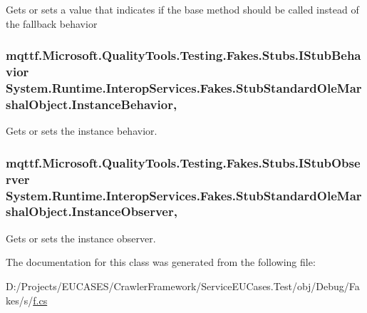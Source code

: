 Gets or sets a value that indicates if the base method should be called instead of the fallback behavior

\hypertarget{class_system_1_1_runtime_1_1_interop_services_1_1_fakes_1_1_stub_standard_ole_marshal_object_a62f581f22e509ef5018a42f3ec38cc95}{
\subsubsection[{Instance\-Behavior}]{\setlength{\rightskip}{0pt plus 5cm}mqttf.\-Microsoft.\-Quality\-Tools.\-Testing.\-Fakes.\-Stubs.\-I\-Stub\-Behavior System.\-Runtime.\-Interop\-Services.\-Fakes.\-Stub\-Standard\-Ole\-Marshal\-Object.\-Instance\-Behavior\hspace{0.3cm}{\ttfamily [get]}, {\ttfamily [set]}}}\label{class_system_1_1_runtime_1_1_interop_services_1_1_fakes_1_1_stub_standard_ole_marshal_object_a62f581f22e509ef5018a42f3ec38cc95}


Gets or sets the instance behavior.

\hypertarget{class_system_1_1_runtime_1_1_interop_services_1_1_fakes_1_1_stub_standard_ole_marshal_object_a542b1c865c60bc80c26a03f98f69e912}{
\subsubsection[{Instance\-Observer}]{\setlength{\rightskip}{0pt plus 5cm}mqttf.\-Microsoft.\-Quality\-Tools.\-Testing.\-Fakes.\-Stubs.\-I\-Stub\-Observer System.\-Runtime.\-Interop\-Services.\-Fakes.\-Stub\-Standard\-Ole\-Marshal\-Object.\-Instance\-Observer\hspace{0.3cm}{\ttfamily [get]}, {\ttfamily [set]}}}\label{class_system_1_1_runtime_1_1_interop_services_1_1_fakes_1_1_stub_standard_ole_marshal_object_a542b1c865c60bc80c26a03f98f69e912}


Gets or sets the instance observer.



The documentation for this class was generated from the following file\-:\begin{DoxyCompactItemize}
\item 
D\-:/\-Projects/\-E\-U\-C\-A\-S\-E\-S/\-Crawler\-Framework/\-Service\-E\-U\-Cases.\-Test/obj/\-Debug/\-Fakes/s/\hyperlink{s_2f_8cs}{f.\-cs}\end{DoxyCompactItemize}

